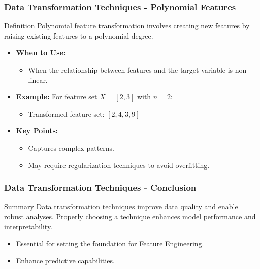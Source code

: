 \documentclass[aspectratio=169]{beamer}
\begin{document}
\begin{frame}[fragile]
    \frametitle{Data Transformation Techniques - Polynomial Features}
    \begin{block}{Definition}
        Polynomial feature transformation involves creating new features by raising existing features to a polynomial degree.
    \end{block}
    
    \begin{itemize}
        \item \textbf{When to Use:}
        \begin{itemize}
            \item When the relationship between features and the target variable is non-linear.
        \end{itemize}
        
        \item \textbf{Example:} For feature set \( X = [2, 3] \) with \( n = 2 \):
        \begin{itemize}
            \item Transformed feature set: \( [2, 4, 3, 9] \)
        \end{itemize}
        
        \item \textbf{Key Points:}
        \begin{itemize}
            \item Captures complex patterns.
            \item May require regularization techniques to avoid overfitting.
        \end{itemize}
    \end{itemize}
\end{frame}

\begin{frame}[fragile]
    \frametitle{Data Transformation Techniques - Conclusion}
    \begin{block}{Summary}
        Data transformation techniques improve data quality and enable robust analyses. Properly choosing a technique enhances model performance and interpretability.
    \end{block}
    
    \begin{itemize}
        \item Essential for setting the foundation for Feature Engineering.
        \item Enhance predictive capabilities.
    \end{itemize}
\end{frame}
\end{document}
